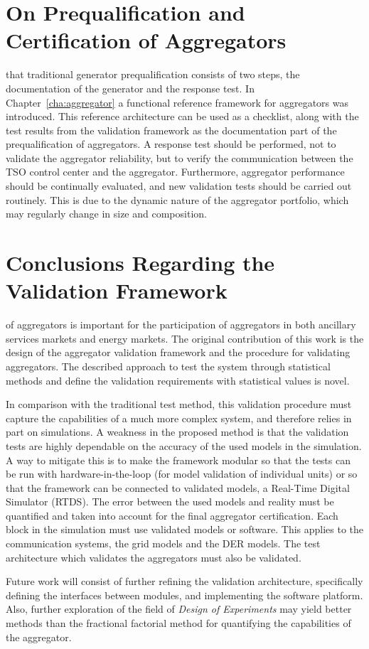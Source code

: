 \section{On Prequalification and Certification of Aggregators}\label{sec:aggpreq}
 that traditional generator prequalification consists of two steps, the documentation of the generator and the response test. In Chapter~\ref{cha:aggregator} a functional reference framework for aggregators was introduced. This reference architecture can be used as a checklist, along with the test results from the validation framework as the documentation part of the prequalification of aggregators. A response test should be performed, not to validate the aggregator reliability, but to verify the communication between the TSO control center and the aggregator. Furthermore, aggregator performance should be continually evaluated, and new validation tests should be carried out routinely. This is due to the dynamic nature of the aggregator portfolio, which may regularly change in size and composition.

\section{Conclusions Regarding the Validation Framework}
 of aggregators is important for the participation of aggregators in both ancillary services markets and energy markets. The original contribution of this work is the design of the aggregator validation framework and the procedure for validating aggregators. The described approach to test the system through statistical methods and define the validation requirements with statistical values is novel.

In comparison with the traditional test method, this validation procedure must capture the capabilities of a much more complex system, and therefore relies in part on simulations. A weakness in the proposed method is that the validation tests are highly dependable on the accuracy of the used models in the simulation. A way to mitigate this is to make the framework modular so that the tests can be run with hardware-in-the-loop (for model validation of individual units) or so that the framework can be connected to validated models, \eg a Real-Time Digital Simulator (RTDS). The error between the used models and reality must be quantified and taken into account for the final aggregator certification. Each block in the simulation must use validated models or software. This applies to the communication systems, the grid models and the DER models. The test architecture which validates the aggregators must also be validated.

Future work will consist of further refining the validation architecture, specifically defining the interfaces between modules, and implementing the software platform. Also, further exploration of the field of \emph{Design of Experiments} may yield better methods than the fractional factorial method for quantifying the capabilities of the aggregator.
